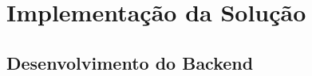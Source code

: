 \chapter{Implementação da Solução}
\label{cap:implementação}


\section{Desenvolvimento do Backend}
\label{sec:implementacao_backend}

%
%
%

